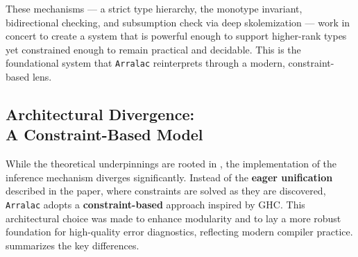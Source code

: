 These mechanisms --- a strict type hierarchy, the monotype invariant, bidirectional checking, and subsumption check via deep skolemization --- work in concert to create a system that is powerful enough to support higher-rank types yet constrained enough to remain practical and decidable. This is the foundational system that \texttt{Arralac} reinterprets through a modern, constraint-based lens.

\subsection[Architectural Divergence: A Constraint-Based Model]{Architectural Divergence: \\ A Constraint-Based Model}
\label{sec:Design:ArralacApproach}

While the theoretical underpinnings are rooted in \cite{jones-practical-2007}, the implementation of the inference mechanism diverges significantly. Instead of the \textbf{eager unification} described in the paper, where constraints are solved as they are discovered, \texttt{Arralac} adopts a \textbf{constraint-based} approach inspired by GHC. This architectural choice was made to enhance modularity and to lay a more robust foundation for high-quality error diagnostics, reflecting modern compiler practice.  summarizes the key differences.

